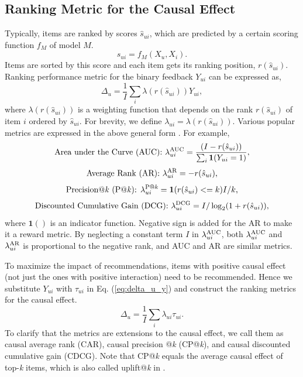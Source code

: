 \documentclass[manuscript,screen]{acmart}
\begin{document}
\subsection{Ranking Metric for the Causal Effect}
\label{subsec:ranking_metric}
Typically, items are ranked by scores $\hat{s}_{ui}$, which are predicted by a certain scoring function $f_M$ of model $M$.
\begin{equation}
\hat{s}_{ui} = f_M(X_u, X_i).
\end{equation}
Items are sorted by this score and each item gets its ranking position, $r (\hat{s}_{ui})$.
Ranking performance metric for the binary feedback $Y_{ui}$ can be expressed as,
\begin{equation}
\label{eq:delta_u_y}
\Delta_u  = \frac{1}{I} \sum_i \lambda(r (\hat{s}_{ui})) Y_{ui},
\end{equation}
where $\lambda(r (\hat{s}_{ui}))$ is a weighting function that depends on the rank $r (\hat{s}_{ui})$ of item $i$ ordered by $\hat{s}_{ui}$.
For brevity, we define $\lambda_{ui} = \lambda(r (\hat{s}_{ui}))$.
Various popular metrics are expressed in the above general form \cite{Yang18,Agarwal19}.
For example,
\begin{equation}
\textnormal{Area under the Curve (AUC): } \lambda_{ui}^{\textnormal{AUC}} = \frac{(I - r (\hat{s}_{ui}))}{\sum_i \boldsymbol{1}(Y_{ui}=1) },
\end{equation}
\begin{equation}
\textnormal{Average Rank (AR): } \lambda_{ui}^{\textnormal{AR}} = -r (\hat{s}_{ui}),
\end{equation}
\begin{equation}
\textnormal{Precision@\textit{k} (P@\textit{k}): } \lambda_{ui}^{\textnormal{P@\textit{k}}} = \boldsymbol{1}(r (\hat{s}_{ui}) <= k) I/k,
\end{equation}
\begin{equation}
\textnormal{Discounted Cumulative Gain (DCG): } \lambda_{ui}^{\textnormal{DCG}} = I/\log_2 (1+r (\hat{s}_{ui})),
\end{equation}
where $\boldsymbol{1}()$ is an indicator function.
Negative sign is added for the AR to make it a reward metric.
By neglecting a constant term $I$ in $\lambda_{ui}^{\textnormal{AUC}}$, both $\lambda_{ui}^{\textnormal{AUC}}$ and $\lambda_{ui}^{\textnormal{AR}}$ is proportional to the negative rank, and AUC and AR are similar metrics.

To maximize the impact of recommendations, items with positive causal effect (not just the ones with positive interaction) need to be recommended.
Hence we substitute $Y_{ui}$ with $\tau_{ui}$ in Eq. (\ref{eq:delta_u_y}) and construct the ranking metrics for the causal effect.
\begin{equation}
\label{eq:delta_u_tau}
\Delta_u  = \frac{1}{I} \sum_i \lambda_{ui} \tau_{ui}.
\end{equation}
To clarify that the metrics are extensions to the causal effect, we call them as causal average rank (CAR), causal precision @\textit{k} (CP@\textit{k}), and causal discounted cumulative gain (CDCG).
Note that CP@\textit{k} equals the average causal effect of top-\textit{k} items, which is also called uplift@\textit{k} in \cite{Sato19}.
\end{document}

